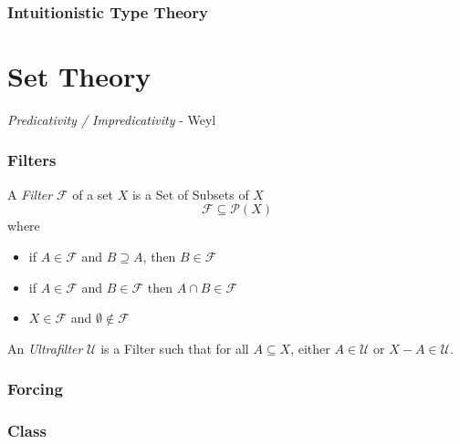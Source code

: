 \documentclass{article}
\begin{document}
\section{Intuitionistic Type Theory}

\part{Set Theory}

\emph{Predicativity / Impredicativity} - Weyl

\section{Filters}

A \emph{Filter} $\mathcal{F}$ of a set $X$ is a Set of Subsets of $X$
\[
    \mathcal{F} \subseteq \mathcal{P}(X)
\]
where
\begin{itemize}
\item if $A \in \mathcal{F}$ and $B \supseteq A$, then $B \in
  \mathcal{F}$
\item if $A \in \mathcal{F}$ and $B \in \mathcal{F}$ then $A \cap B
  \in \mathcal{F}$
\item $X \in \mathcal{F}$ and $\emptyset \notin \mathcal{F}$
\end{itemize}
An \emph{Ultrafilter} $\mathcal{U}$ is a Filter such that for all $A
\subseteq X$, either $A \in \mathcal{U}$ or $X - A \in \mathcal{U}$.

\section{Forcing}\label{subsec:forcing}

\section{Class}\label{sec:classes}
\end{document}
